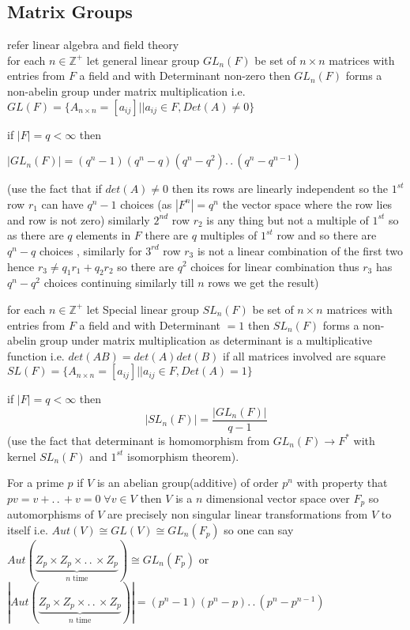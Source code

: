 \documentclass[11pt]{extarticle}
\newcommand{\Z}{\mathbb{Z}}
\newcommand{\ra}{\rightarrow}
\newcommand{\w}[1]{\text{#1}}
\newcommand{\ck}{.\,.\,}
\newcommand{\snote}[1]{{\footnotesize(#1)}}
\newcommand{\tbx}[2][]{
	\begin{tcolorbox}[enhanced,breakable,size=small,colback=black!2!white,title={#1},arc is angular, arc=1.5mm,drop fuzzy shadow]
		#2
	\end{tcolorbox}
}
\newcommand{\tm}{\times}
\begin{document}
\begin{multicols}{2}
	\subsection{Matrix Groups}
\tbx{ refer linear algebra and field theory \\
 for each $ n\in \Z^+ $ let general linear group $ GL_n(F) $ be set of $ n \tm n $ matrices with entries from $ F $ a field and with Determinant non-zero then $ GL_n(F) $ forms a non-abelin group  under matrix multiplication i.e.\\
$ GL(F) = \{A_{n\tm n}=[a_{ij}]|| a_{ij}\in F, Det(A)\neq 0\}$ }
 \tbx{if $ |F|=q<\infty $ then 
 	\begin{center}
 		$ |GL_n(F) |=(q^n-1)(q^n-q)(q^n-q^2)\ck (q^n-q^{n-1})$
 	\end{center}
\snote{use the fact that if $ det(A)\neq 0 $ then its rows are linearly independent so the $1^{st} $ row $r_1$ can have $ q^n-1 $ choices (as $ |F^n|=q^n $ the vector space where the row lies and row is not zero) similarly $ 2^{nd} $ row $ r_2 $ is any thing but not a multiple of $ 1^{st} $ so as there are $ q $ elements in $ F $ there are $ q $ multiples of $ 1^{st} $ row and so there are $ q^n-q $ choices , similarly for $ 3^{rd} $ row $ r_3 $ is not a linear combination of the first two hence $ r_3\neq q_1 r_1+q_2r_2 $ so there are $ q^2 $ choices for linear combination thus $r_3 $ has $ q^n-q^2 $ choices continuing similarly till $ n $ rows we get the result}}
\tbx{ 
	for each $ n\in \Z^+ $ let Special linear group $ SL_n(F) $ be set of $ n \tm n $ matrices with entries from $ F $ a field and with Determinant $ =1 $ then $ SL_n(F) $ forms a non-abelin group  under matrix multiplication as determinant is a multiplicative function i.e. $ det(AB)=det(A)det(B)$ if all matrices involved are square\\
	$ SL(F) =\{A_{n\tm n}=[a_{ij}]|| a_{ij}\in F, Det(A)=1\}$ }
	\tbx{ if $ |F|=q<\infty  $ then 
	\[|SL_n(F)|= \frac{ |GL_n(F) |}{q-1} \]  
	\snote{use the fact that determinant is homomorphism from $ GL_n(F)\ra F^* $ with kernel $ SL_n(F) $ and $ 1^{st} $ isomorphism theorem}.}
	\tbx{ For a prime $ p $ if $ V $ is an abelian group(additive) of order $ p^n $ with property that $ pv=v+\ck+v=0 \; \forall v\in V $ then $ V $ is a $ n $ dimensional vector space over $ F_p $ so automorphisms of $ V $ are precisely non singular linear transformations from $ V $ to itself i.e. $ Aut(V) \cong GL(V)\cong GL_n(F_p)$ so one can say $ Aut(\underbrace{Z_p\tm Z_p\tm \ck \tm Z_p}_{n\w{ time}}) \cong GL_n(F_p)$ or $ | Aut(\underbrace{Z_p\tm Z_p\tm \ck \tm Z_p}_{n\w{ time}}) |=(p^n-1)(p^n-p)\ck (p^n-p^{n-1}) $ }

\end{multicols}
\end{document}
